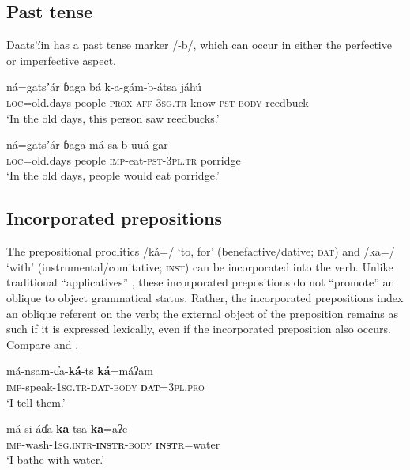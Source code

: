 \documentclass[output=paper]{langsci/langscibook}
\begin{document}
\subsection{Past tense}\label{sec:ahlandc:4.4}

Daats’íin has a past tense marker /-b/, which can occur in either the perfective  or imperfective  aspect.

\ea\label{ex:ahlandc:21}
\gll
ná=gatsʼár       ɓaga      bá  k-a-gám-b-átsa   jáhú \\
\textsc{loc}=old.days  people   \textsc{prox}   \textsc{aff-3sg.tr}{}-know-\textsc{pst-body}  reedbuck \\
\glt
‘In the old days, this person saw reedbucks.’
\z

\ea\label{ex:ahlandc:22}
\gll
ná=gatsʼár       ɓaga    má-sa-b-uuá  gar \\
\textsc{loc}=old.days   people \textsc{imp}{}-eat-\textsc{pst}{}-\textsc{3pl.tr}  porridge \\
\glt
‘In the old days, people would eat porridge.’
\z


\subsection{Incorporated prepositions}\label{sec:ahlandc:4.5}

The prepositional proclitics /ká=/ ‘to, for’ (benefactive/dative; \textsc{dat}) and /ka=/ ‘with’ (instrumental/comitative; \textsc{inst}) can be incorporated into the verb. Unlike traditional “applicatives” \citep{Payne1997}, these incorporated prepositions do not “promote” an oblique to object grammatical status. Rather, the incorporated prepositions index an oblique referent on the verb; the external object of the preposition remains as such if it is expressed lexically, even if the incorporated preposition also occurs. Compare  and . 

\ea\label{ex:ahlandc:23}
\gll
má-nsam-ɗa-\textbf{ká}{}-ts                      \textbf{ká}=máʔam \\
\textsc{imp}{}-speak-\textsc{1sg.tr-}\textbf{\textsc{dat}}\textsc{{}-body} \textbf{\textsc{dat}}\textsc{=3pl.pro} \\
\glt
‘I tell them.’
\z

\ea\label{ex:ahlandc:24}
\gll
má-si-áɗa-\textbf{ka}{}-tsa    \textbf{ka}=aʔe \\
\textsc{imp}{}-wash-\textsc{1sg.intr-}\textbf{\textsc{instr}}\textsc{{}-body} \textbf{\textsc{instr}}\textsc{=}water   \\
\glt
‘I bathe with water.’
\z
\end{document}
